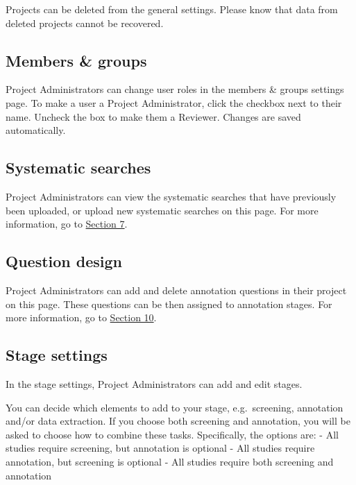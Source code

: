\documentclass[
]{book}
\begin{document}
Projects can be deleted from the general settings. Please know that data from deleted projects cannot be recovered.

\hypertarget{members-groups}{%
\subsection{Members \& groups}\label{members-groups}}

Project Administrators can change user roles in the members \& groups settings page. To make a user a Project Administrator, click the checkbox next to their name. Uncheck the box to make them a Reviewer. Changes are saved automatically.

\hypertarget{systematic-searches}{%
\subsection{Systematic searches}\label{systematic-searches}}

Project Administrators can view the systematic searches that have previously been uploaded, or upload new systematic searches on this page. For more information, go to \href{https://camaradesuk.github.io/syrf_userguide/systematicSearch.html}{Section 7}.

\hypertarget{question-design}{%
\subsection{Question design}\label{question-design}}

Project Administrators can add and delete annotation questions in their project on this page. These questions can be then assigned to annotation stages. For more information, go to \href{https://camaradesuk.github.io/syrf_userguide/projectannotation.html}{Section 10}.

\hypertarget{stage-settings}{%
\subsection{Stage settings}\label{stage-settings}}

In the stage settings, Project Administrators can add and edit stages.

You can decide which elements to add to your stage, e.g.~screening, annotation and/or data extraction. If you choose both screening and annotation, you will be asked to choose how to combine these tasks. Specifically, the options are:
- All studies require screening, but annotation is optional
- All studies require annotation, but screening is optional
- All studies require both screening and annotation
\end{document}
